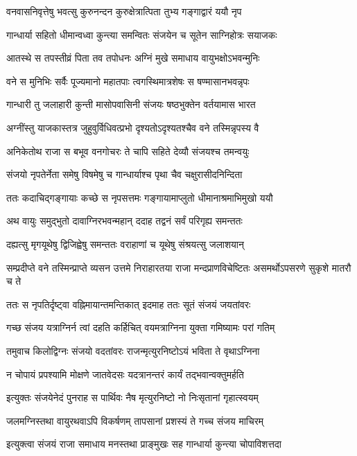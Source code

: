 \twolineshloka
{वनवासनिवृत्तेषु भवत्सु कुरुनन्दन}
{कुरुक्षेत्रात्पिता तुभ्य गङ्गाद्वारं ययौ नृप}


\twolineshloka
{गान्धार्या सहितो धीमान्वध्वा कुन्त्या समन्वितः}
{संजयेन च सूतेन साग्निहोत्रः सयाजकः}


\twolineshloka
{आतस्थे स तपस्तीव्रं पिता तव तपोधनः}
{अग्निं मुखे समाधाय वायुभक्षोऽभवन्मुनिः}


\twolineshloka
{वने स मुनिभिः सर्वैः पूज्यमानो महातपाः}
{त्वगस्थिमात्रशेषः स षण्मासानभवन्नृपः}


\twolineshloka
{गान्धारी तु जलाहारी कुन्ती मासोपवासिनी}
{संजयः षष्ठभुक्तेन वर्तयामास भारत}


\twolineshloka
{अग्नींस्तु याजकास्तत्र जुहुवुर्विधिवत्प्रभो}
{दृश्यतोऽदृश्यतश्चैव वने तस्मिन्नृपस्य वै}


\twolineshloka
{अनिकेतोथ राजा स बभूव वनगोचरः}
{ते चापि सहिते देव्यौ संजयश्च तमन्वयुः}


\twolineshloka
{संजयो नृपतेर्नेता समेषु विषमेषु च}
{गान्धार्याश्च पृथा चैव चक्षुरासीदनिन्दिता}


\twolineshloka
{ततः कदाचिद्गङ्गायाः कच्छे स नृपसत्तमः}
{गङ्गायामाप्लुतो धीमानाश्रमाभिमुखो ययौ}


\twolineshloka
{अथ वायुः समुद्भुतो दावाग्निरभवन्महान्}
{ददाह तद्वनं सर्वं परिगृह्य समन्ततः}


\twolineshloka
{दह्यत्सु मृगयूथेषु द्विजिह्वेषु समन्ततः}
{वराहाणां च यूथेषु संश्रयत्सु जलाशयान्}


\threelineshloka
{सम्प्रदीप्ते वने तस्मिन्प्राप्ते व्यसन उत्तमे}
{निराहारतया राजा मन्दप्राणविचेष्टितः}
{असमर्थोऽपसरणे सुकृशे मातरौ च ते}


\twolineshloka
{ततः स नृपतिर्दृष्ट्वा वह्निमायान्तमन्तिकात्}
{इदमाह ततः सूतं संजयं जयतांवरः}


\twolineshloka
{गच्छ संजय यत्राग्निर्न त्वां दहति कर्हिचित्}
{वयमत्राग्निना युक्ता गमिष्यामः परां गतिम्}


\twolineshloka
{तमुवाच किलोद्विग्नः संजयो वदतांवरः}
{राजन्मृत्युरनिष्टोऽयं भविता ते वृथाऽग्निना}


\twolineshloka
{न चोपायं प्रपश्यामि मोक्षणे जातवेदसः}
{यदत्रानन्तरं कार्यं तद्भवान्वक्तुमर्हति}


\twolineshloka
{इत्युक्तः संजयेनेदं पुनराह स पार्थिवः}
{नैष मृत्युरनिष्टो नो निःसृतानां गृहात्स्वयम्}


\twolineshloka
{जलमग्निस्तथा वायुरथवाऽपि विकर्षणम्}
{तापसानां प्रशस्यं ते गच्च संजय माचिरम्}


\twolineshloka
{इत्युक्त्वा संजयं राजा समाधाय मनस्तथा}
{प्राङ्मुखः सह गान्धार्या कुन्त्या चोपाविशत्तदा}


